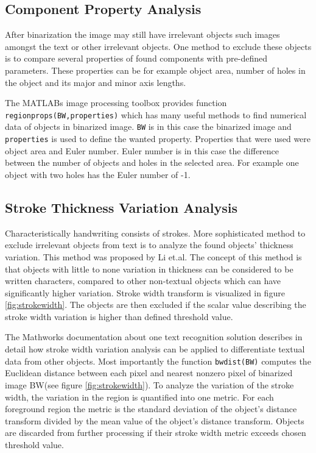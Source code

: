 \documentclass{article}
\def\code#1{\texttt{#1}}
\begin{document}
        \subsection{Component Property Analysis}
          After binarization the image may still have irrelevant objects such images amongst the text or other irrelevant objects. One method to exclude these objects is to compare several properties of found components with pre-defined parameters. These properties can be for example object area, number of holes in the object and its major and minor axis lengths.

          The MATLABs image processing toolbox  provides function \code{regionprops(BW,properties)} which has many useful methods to find numerical data of objects in binarized image. \code{BW} is in this case the binarized image and \code{properties} is used to define the wanted property. Properties that were used were object area and Euler number. Euler number is in this case the difference between the number of objects and holes in the selected area. For example one object with two holes has the Euler number of -1.

        \subsection{Stroke Thickness Variation Analysis}
          Characteristically handwriting consists of strokes. More sophisticated method to exclude irrelevant objects from text is to analyze the found objects' thickness variation. This method was proposed by Li et.al. \cite{Li} The concept of this method is that objects with little to none variation in thickness can be considered to be written characters, compared to other non-textual objects which can have significantly higher variation. Stroke width transform is visualized in figure \ref{fig:strokewidth}. The objects are then excluded if the scalar value describing the stroke width variation is higher than defined threshold value.

          The Mathworks documentation about one text recognition solution describes in detail how stroke width variation analysis can be applied to differentiate textual data from other objects. \cite{MathworksTextRecognition} Most importantly the function \code{bwdist(BW)} computes the Euclidean distance between each pixel and nearest nonzero pixel of binarized image BW(see figure \ref{fig:strokewidth}). To analyze the variation of the stroke width, the variation in the region is quantified into one metric. For each foreground region the metric is the standard deviation of the object's distance transform divided by the mean value of the object's distance transform. Objects are discarded from further processing if their stroke width metric exceeds chosen threshold value.
\end{document}
